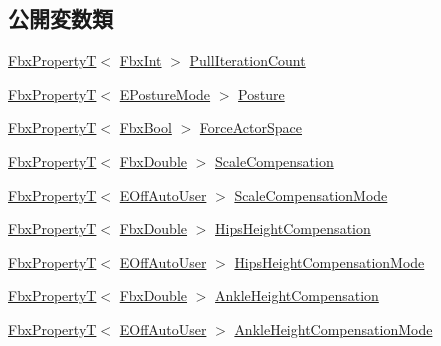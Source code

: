 \subsection*{公開変数類}
\begin{DoxyCompactItemize}
\item 
\hyperlink{class_fbx_property_t}{Fbx\+PropertyT}$<$ \hyperlink{fbxtypes_8h_a088fa96de3b0b3ea69f0f6afef525dfb}{Fbx\+Int} $>$ \hyperlink{class_fbx_character_aa9fba8bc68ce346b97a22553e84635b0}{Pull\+Iteration\+Count}
\item 
\hyperlink{class_fbx_property_t}{Fbx\+PropertyT}$<$ \hyperlink{class_fbx_character_a75545d98d73cc8dd7c1bf491bf004113}{E\+Posture\+Mode} $>$ \hyperlink{class_fbx_character_ae4d654dc816661a08bc56afe92777619}{Posture}
\item 
\hyperlink{class_fbx_property_t}{Fbx\+PropertyT}$<$ \hyperlink{fbxtypes_8h_a92e0562b2fe33e76a242f498b362262e}{Fbx\+Bool} $>$ \hyperlink{class_fbx_character_a83c495dc866015af743d89e63aaa4d9c}{Force\+Actor\+Space}
\item 
\hyperlink{class_fbx_property_t}{Fbx\+PropertyT}$<$ \hyperlink{fbxtypes_8h_a171e72a1c46fc15c1a6c9c31948c1c5b}{Fbx\+Double} $>$ \hyperlink{class_fbx_character_a194a407eb876f08cfca8740d58fdea77}{Scale\+Compensation}
\item 
\hyperlink{class_fbx_property_t}{Fbx\+PropertyT}$<$ \hyperlink{class_fbx_character_ab698a180e6f900ba8317257749c2ecce}{E\+Off\+Auto\+User} $>$ \hyperlink{class_fbx_character_afe6b3b37bf087b1a2934873067cad2ab}{Scale\+Compensation\+Mode}
\item 
\hyperlink{class_fbx_property_t}{Fbx\+PropertyT}$<$ \hyperlink{fbxtypes_8h_a171e72a1c46fc15c1a6c9c31948c1c5b}{Fbx\+Double} $>$ \hyperlink{class_fbx_character_afa6965f25d485e48fcde6fb77a102096}{Hips\+Height\+Compensation}
\item 
\hyperlink{class_fbx_property_t}{Fbx\+PropertyT}$<$ \hyperlink{class_fbx_character_ab698a180e6f900ba8317257749c2ecce}{E\+Off\+Auto\+User} $>$ \hyperlink{class_fbx_character_a935d82d838ca32350e157f080d10d896}{Hips\+Height\+Compensation\+Mode}
\item 
\hyperlink{class_fbx_property_t}{Fbx\+PropertyT}$<$ \hyperlink{fbxtypes_8h_a171e72a1c46fc15c1a6c9c31948c1c5b}{Fbx\+Double} $>$ \hyperlink{class_fbx_character_a06403d453ebdc44a9ac43d4015984746}{Ankle\+Height\+Compensation}
\item 
\hyperlink{class_fbx_property_t}{Fbx\+PropertyT}$<$ \hyperlink{class_fbx_character_ab698a180e6f900ba8317257749c2ecce}{E\+Off\+Auto\+User} $>$ \hyperlink{class_fbx_character_a8c6ef4f12810113156cfbe6c580c0386}{Ankle\+Height\+Compensation\+Mode}

\end{DoxyCompactItemize}
